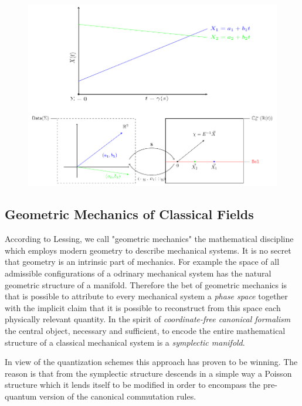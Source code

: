 \documentclass[Main]{subfiles}
\begin{document}
		\begin{figure}[h!]
			\includegraphics[width=\textwidth]{Pictures/Jacobi1D_GeometricPicturePanoramica}	
			\caption{ 
			}	
		\end{figure}		


	\subsection{Geometric Mechanics of Classical Fields}
		According to Lessing\cite{Lessig2012}, we call "geometric mechanics" the mathematical discipline which employs modern geometry to describe mechanical systems.
		It is no secret that geometry is an intrinsic part of mechanics. For example the space of all admissible configurations of a odrinary mechanical system has the natural geometric structure of a manifold.
		Therefore the bet of geometric mechanics is that is possible to attribute to every mechanical system a  \emph{phase space} together with the implicit claim that it is possible to reconstruct from this space each physically relevant quantity.%
		In the spirit of \emph{coordinate-free canonical formalism} the central object, necessary and sufficient, to encode the entire mathematical structure of a classical mechanical system is a \emph{symplectic manifold}.


		In view of the quantization schemes this approach has proven to be winning.
		The reason is that from the symplectic structure descends in a simple way a Poisson structure which it lends itself to be modified in order to encompass the pre-quantum version of the canonical commutation rules.
\end{document}
